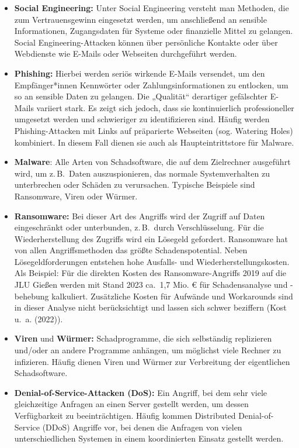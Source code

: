 \documentclass[
  11pt,
  letterpaper,
  DIV=11,
  twoside]{scrreprt}
\begin{document}
\begin{itemize}
\item
  \textbf{Social Engineering:} Unter Social Engineering versteht man
  Methoden, die zum Vertrauensgewinn eingesetzt werden, um anschließend
  an sensible Informationen, Zugangsdaten für Systeme oder finanzielle
  Mittel zu gelangen. Social Engineering-Attacken können über
  persönliche Kontakte oder über Webdienste wie E-Mails oder Webseiten
  durchgeführt werden.
\item
  \textbf{Phishing:} Hierbei werden seriös wirkende E-Mails versendet,
  um den Empfänger*innen Kennwörter oder Zahlungsinformationen zu
  entlocken, um so an sensible Daten zu gelangen. Die „Qualität``
  derartiger gefälschter E-Mails variiert stark. Es zeigt sich jedoch,
  dass sie kontinuierlich professioneller umgesetzt werden und
  schwieriger zu identifizieren sind. Häufig werden Phishing-Attacken
  mit Links auf präparierte Webseiten (sog. Watering Holes) kombiniert.
  In diesem Fall dienen sie auch als Haupteintrittstore für Malware.
\item
  \textbf{Malware}: Alle Arten von Schadsoftware, die auf dem
  Zielrechner ausgeführt wird, um z.\,B.~Daten auszuspionieren, das
  normale Systemverhalten zu unterbrechen oder Schäden zu verursachen.
  Typische Beispiele sind Ransomware, Viren oder Würmer.
\item
  \textbf{Ransomware:} Bei dieser Art des Angriffs wird der Zugriff auf
  Daten eingeschränkt oder unterbunden, z.\,B.~durch Verschlüsselung.
  Für die Wiederherstellung des Zugriffs wird ein Lösegeld gefordert.
  Ransomware hat von allen Angriffsmethoden das größte
  Schadenspotential. Neben Lösegeldforderungen entstehen hohe Ausfalls-
  und Wiederherstellungskosten.\\
  Als Beispiel: Für die direkten Kosten des Ransomware-Angriffs 2019 auf
  die JLU Gießen werden mit Stand 2023 ca.~1,7 Mio. € für
  Schadensanalyse und -behebung kalkuliert. Zusätzliche Kosten für
  Aufwände und Workarounds sind in dieser Analyse nicht berücksichtigt
  und lassen sich schwer beziffern (Kost u.~a. (2022)).
\item
  \textbf{Viren} und \textbf{Würmer:} Schadprogramme, die sich
  selbständig replizieren und/oder an andere Programme anhängen, um
  möglichst viele Rechner zu infizieren. Häufig dienen Viren und Würmer
  zur Verbreitung der eigentlichen Schadsoftware.
\item
  \textbf{Denial-of-Service-Attacken (DoS):} Ein Angriff, bei dem sehr
  viele gleichzeitige Anfragen an einen Server gestellt werden, um
  dessen Verfügbarkeit zu beeinträchtigen. Häufig kommen Distributed
  Denial-of-Service (DDoS) Angriffe vor, bei denen die Anfragen von
  vielen unterschiedlichen Systemen in einem koordinierten Einsatz
  gestellt werden.
\end{itemize}
\end{document}
